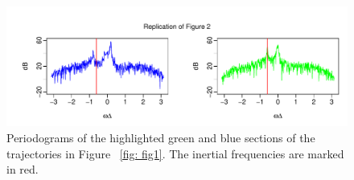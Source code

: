 \documentclass{stat572Style}
\begin{document}
\begin{figure}[h!]
  \centering
    \includegraphics[width=\textwidth]{ReplicatedFigures/fig2.pdf}
        \caption{Periodograms of the highlighted green and blue sections of the trajectories in Figure ~\ref{fig: fig1}. The inertial frequencies are marked in red. }
        	\label{fig: fig2}
\end{figure}
\end{document}
